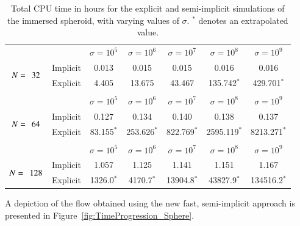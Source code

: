 \documentclass[preprint,12pt]{elsarticle}
\newcommand{\TableTopSpace}{\rule{0cm}{2.625ex}}
\begin{document}
\begin{table}
\caption{Total CPU time in hours for the explicit and semi-implicit simulations of the immersed spheroid, with varying values of $\sigma$. $^*$ denotes an extrapolated value.}
\label{table:SimulationTime_Sphere}
\begin{center}

\begin{tabular}{c c c c c c c}
  &  & $\sigma=10^5$ & $\sigma=10^6$ & $\sigma=10^7$ & $\sigma=10^{8}$ & $\sigma=10^{9}$ \\
\cline{3-7}
\multirow{2}{*}{$N=\hspace{1ex} 32$}
& \multicolumn{1}{c|}{Implicit} & \TableTopSpace
	0.013 & 0.015 & 0.015 & 0.016 & 0.016 \\
& \multicolumn{1}{c|}{Explicit} & \TableTopSpace
	4.405 & 13.675 & 43.467 & 135.742$^*$ & 429.701$^*$ \\
\vspace{.15 cm}
\\
  &  & $\sigma=10^5$ & $\sigma=10^6$ & $\sigma=10^7$ & $\sigma=10^{8}$ & $\sigma=10^{9}$ \\
\cline{3-7}
\multirow{2}{*}{$N=\hspace{1ex} 64$}
& \multicolumn{1}{c|}{Implicit} & \TableTopSpace
	0.127 & 0.134 & 0.140 & 0.138 & 0.137 \\
& \multicolumn{1}{c|}{Explicit} & \TableTopSpace
	83.155$^*$ & 253.626$^*$ & 822.769$^*$ & 2595.119$^*$ & 8213.271$^*$ \\
\vspace{.15 cm}
\\
  &  & $\sigma=10^5$ & $\sigma=10^6$ & $\sigma=10^7$ & $\sigma=10^{8}$ & $\sigma=10^{9}$ \\
\cline{3-7}
\multirow{2}{*}{$N=\hspace{1ex} 128$}
& \multicolumn{1}{c|}{Implicit} & \TableTopSpace
	1.057 & 1.125 & 1.141 & 1.151 & 1.167 \\
& \multicolumn{1}{c|}{Explicit} & \TableTopSpace
	1326.0$^*$ & 4170.7$^*$ & 13904.8$^*$ & 43827.9$^*$ & 134516.2$^*$ \\
\end{tabular}
   
\end{center}
\end{table}
A depiction of the flow obtained using the new fast, semi-implicit approach  is presented in Figure~\ref{fig:TimeProgression_Sphere}. 
\end{document}
